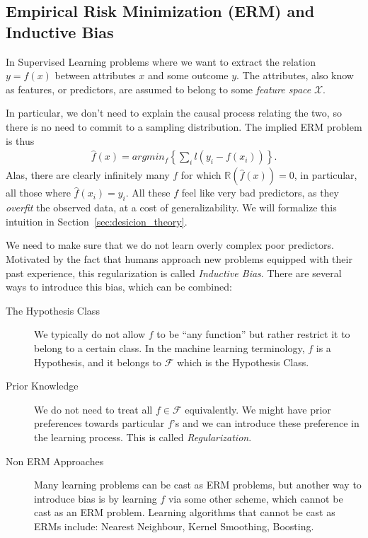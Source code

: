 \documentclass[12pt,a4paper]{article}
\theoremstyle{plain}
\theoremstyle{definition}
\newcommand{\loss}{l}
\newcommand{\riskn}{\mathbb{R}}
\newcommand{\argmin}[2]{argmin_{#1}\left\{ #2 \right\}}
\newcommand{\hyp}{f}
\newcommand{\hypclass}{\mathcal{F}}
\newcommand{\featureS}{\mathcal{X}}
\begin{document}
\subsection{Empirical Risk Minimization (ERM) and Inductive Bias}
In Supervised Learning problems where we want to extract the relation $y=\hyp(x)$ between attributes $x$ and some outcome $y$.
The attributes, also know as features, or predictors, are assumed to belong to some \emph{feature space} $\featureS$. 

In particular, we don't need to explain the causal process relating the two, so there is no need to commit to a sampling distribution. The implied ERM problem is thus
\begin{align}
	\hat{\hyp}(x) = \argmin{\hyp}{\sum_i \loss(y_i - \hyp(x_i))}.
\end{align}
Alas, there are clearly infinitely many $\hyp$ for which $\riskn(\hat{\hyp}(x))=0$, in particular, all those where $\hat{\hyp}(x_i)=y_i$.
All these $\hyp$ feel like very bad predictors, as they \emph{overfit} the observed data, at a cost of generalizability.
We will formalize this intuition in Section~\ref{sec:desicion_theory}. 

We need to make sure that we do not learn overly complex poor predictors. 
Motivated by the fact that humans approach new problems equipped with their past experience, this regularization is called \emph{Inductive Bias}. 
There are several ways to introduce this bias, which can be combined:
\begin{description}
\item[The Hypothesis Class]
We typically do not allow $\hyp$ to be ``any function'' but rather restrict it to belong to a certain class. In the machine learning terminology, $\hyp$ is a Hypothesis, and it belongs to $\hypclass$ which is the Hypothesis Class.
\item[Prior Knowledge] We do not need to treat all $\hyp \in \hypclass$ equivalently. We might have prior preferences towards particular $\hyp$'s and we can introduce these preference in the learning process. This is called \emph{Regularization}.
\item[Non ERM Approaches] Many learning problems can be cast as ERM problems, but another way to introduce bias is by learning $\hyp$ via some other scheme, which cannot be cast as an ERM problem. 
Learning algorithms that cannot be cast as ERMs include: Nearest Neighbour, Kernel Smoothing, Boosting.
\end{description}
\end{document}
